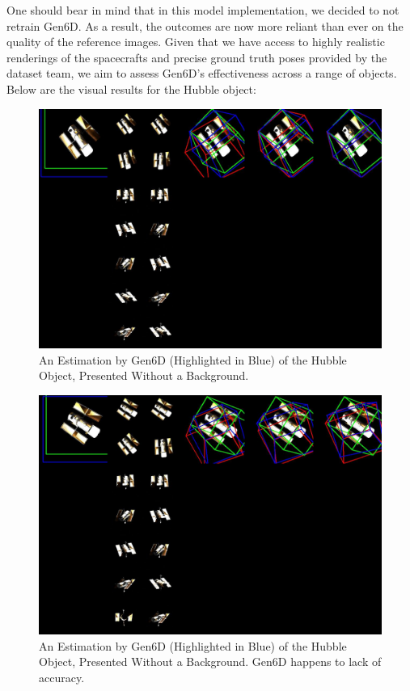 \bigbreak 

One should bear in mind that in this model implementation, we decided to not retrain Gen6D. As a result, the outcomes are now more reliant than ever on the quality of the reference images. Given that we have access to highly realistic renderings of the spacecrafts and precise ground truth poses provided by the dataset team, we aim to assess Gen6D's effectiveness across a range of objects. Below are the visual results for the Hubble object:

\begin{figure}[ht]
  \centering
  \includegraphics[width=\textwidth]{data/res2.jpg}
  \caption{An Estimation by Gen6D (Highlighted in Blue) of the Hubble Object, Presented Without a Background.}
  \label{fig:cap1}
\end{figure}

\begin{figure}[ht]
  \centering
  \includegraphics[width=\textwidth]{data/res3.jpg}
  \caption{An Estimation by Gen6D (Highlighted in Blue) of the Hubble Object, Presented Without a Background. Gen6D happens to lack of accuracy.}
  \label{fig:cap1}
\end{figure}

